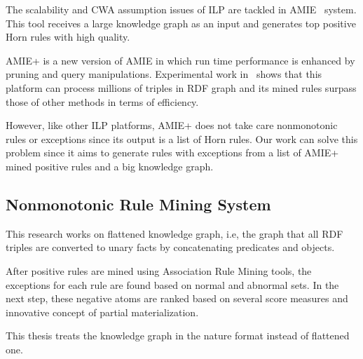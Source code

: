 The scalability and CWA assumption issues of ILP are tackled in AMIE~\cite{ref10} system. This tool receives a large knowledge graph as an input and generates top positive Horn rules with high quality.

AMIE+ is a new version of AMIE in which run time performance is enhanced by pruning and query manipulations. Experimental work in~\cite{ref10} shows that this platform can process millions of triples in RDF graph and its mined rules surpass those of other methods in terms of efficiency.

However, like other ILP platforms, AMIE+ does not take care nonmonotonic rules or exceptions since its output is a list of Horn rules. Our work can solve this problem since it aims to generate rules with exceptions from a list of AMIE+ mined positive rules and a big knowledge graph.

\subsection{Nonmonotonic Rule Mining System}

This research works on flattened knowledge graph, i.e, the graph that all RDF triples are converted to unary facts by concatenating predicates and objects.

After positive rules are mined using Association Rule Mining tools, the exceptions for each rule are found based on normal and abnormal sets. In the next step, these negative atoms are ranked based on several score measures and innovative concept of partial materialization.

This thesis treats the knowledge graph in the nature format instead of flattened one.

